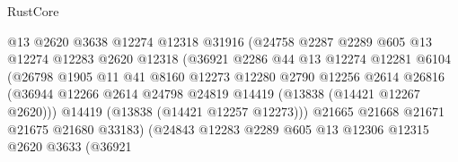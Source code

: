 \begin{lexlean}{RustCore}
\begin{coremodule}
                                  @13
                                  @2620
                                  @3638
                                  @12274
                                  @12318
                                  @31916
                                  (@24758
                                    @2287
                                    @2289
                                    @605
                                    @13
                                    @12274
                                    @12283
                                    @2620
                                    @12318
                                    (@36921
                                      @2286
                                      @44
                                      @13
                                      @12274
                                      @12281
                                      @6104
                                      (@26798
                                        @1905
                                        @11
                                        @41
                                        @8160
                                        @12273
                                        @12280
                                        @2790
                                        @12256
                                        @2614
                                        @26816
                                        (@36944
                                          @12266
                                          @2614
                                          @24798
                                          @24819
                                          @14419
                                          (@13838 (@14421 @12267 @2620)))
                                        @14419
                                        (@13838 (@14421 @12257 @12273)))
                                      @21665
                                      @21668
                                      @21671
                                      @21675
                                      @21680
                                      @33183)
                                    (@24843
                                      @12283
                                      @2289
                                      @605
                                      @13
                                      @12306
                                      @12315
                                      @2620
                                      @3633
                                      (@36921

\end{coremodule}
\end{lexlean}
